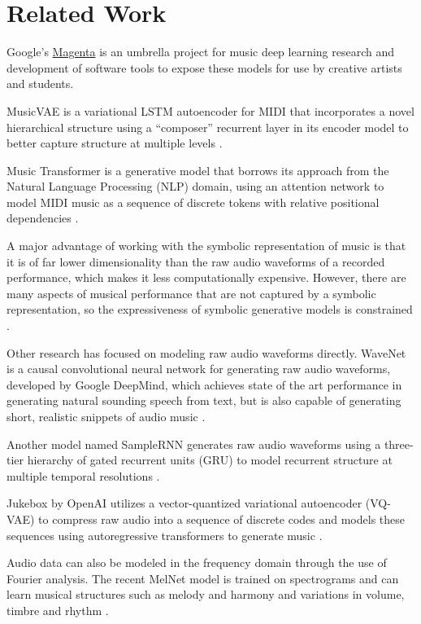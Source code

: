 \documentclass[sigconf,authorversion]{acmart}
\begin{document}
\section{Related Work}

Google's \href{https://magenta.tensorflow.org/}{Magenta} is an umbrella project
for music deep learning research and development of software tools to expose
these models for use by creative artists and students.

MusicVAE is a variational LSTM autoencoder for MIDI that incorporates a
novel hierarchical structure using a ``composer'' recurrent layer in its encoder
model to better capture structure at multiple
levels \cite{roberts_hierarchical_2018}.

Music Transformer is a generative model that borrows its approach from the
Natural Language Processing (NLP) domain, using an attention network to model
MIDI music as a sequence of discrete tokens with relative positional dependencies
\cite{huang_music_2018}.

A major advantage of working with the symbolic representation of music is that
it is of far lower dimensionality than the raw audio waveforms of a recorded
performance, which makes it less computationally expensive. However, there are
many aspects of musical performance that are not captured by a symbolic
representation, so the expressiveness of symbolic generative models is
constrained \cite{manzelli_conditioning_2018}.

Other research has focused on modeling raw audio waveforms directly. WaveNet is
a causal convolutional neural network for generating raw audio waveforms,
developed by Google DeepMind, which achieves state of the art performance in
generating natural sounding speech from text, but is also capable of generating
short, realistic snippets of audio music \cite{oord_wavenet_2016}.

Another model named SampleRNN generates raw audio waveforms using a three-tier
hierarchy of gated recurrent units (GRU) to model recurrent structure at
multiple temporal resolutions \cite{mehri_samplernn_2017}.

Jukebox by OpenAI utilizes a vector-quantized variational autoencoder (VQ-VAE)
to compress raw audio into a sequence of discrete codes and models these
sequences using autoregressive transformers to generate music
\cite{dhariwal2020jukebox}.

Audio data can also be modeled in the frequency domain through the use of
Fourier analysis. The recent MelNet model is trained on spectrograms and can
learn musical structures such as melody and harmony and variations in volume,
timbre and rhythm \cite{vasquez2019melnet}.
\end{document}
